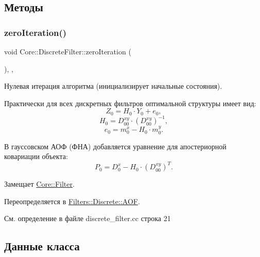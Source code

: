 \subsection{Методы}
\hypertarget{class_core_1_1_discrete_filter_a658617c64c7067bb6b98b5e9d78f982e}{}\label{class_core_1_1_discrete_filter_a658617c64c7067bb6b98b5e9d78f982e} 
\subsubsection{\texorpdfstring{zero\+Iteration()}{zeroIteration()}}
{\footnotesize\ttfamily void Core\+::\+Discrete\+Filter\+::zero\+Iteration (\begin{DoxyParamCaption}{ }\end{DoxyParamCaption})\hspace{0.3cm}{\ttfamily [override]}, {\ttfamily [protected]}, {\ttfamily [virtual]}}



Нулевая итерация алгоритма (инициализирует начальные состояния). 

Практически для всех дискретных фильтров оптимальной структуры имеет вид\+: \[Z_0 = H_0 \cdot Y_0 + e_0,\] \[H_0 = D_{00}^{xy} \cdot (D_{00}^{xy})^{-1},\] \[e_0 = m_0^x - H_0 \cdot m_0^y.\]

В гауссовском АОФ (ФНА) добавляется уравнение для апостериорной ковариации объекта\+: \[P_0 = D_0^x - H_0 \cdot (D_{00}^{xy})^T.\] 

Замещает \hyperlink{class_core_1_1_filter_af95880b734c4b8dc3d8c02f222b32506}{Core\+::\+Filter}.



Переопределяется в \hyperlink{class_filters_1_1_discrete_1_1_a_o_f_aa822fe74d7ca160f898db1c1289e17f7}{Filters\+::\+Discrete\+::\+A\+OF}.



См. определение в файле discrete\+\_\+filter.\+cc строка 21



\subsection{Данные класса}
\hypertarget{class_core_1_1_discrete_filter_a6a2d67be8eaa0df383fe080474975faa}{}\label{class_core_1_1_discrete_filter_a6a2d67be8eaa0df383fe080474975faa} 
